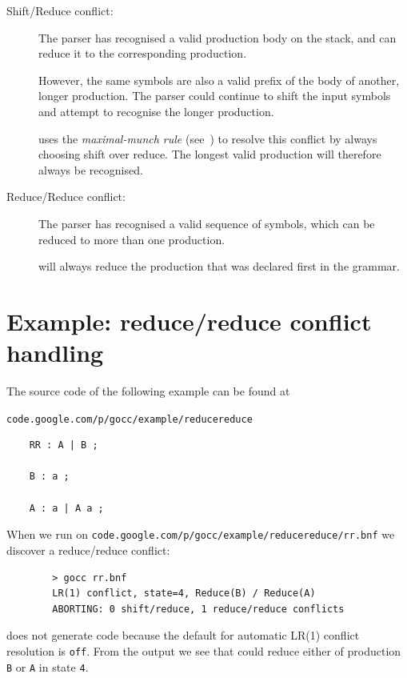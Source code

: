 \documentclass[12pt]{article}
\begin{document}
	\begin{description}
		\item[Shift/Reduce conflict:] The parser has recognised a valid production body on the stack, and can reduce it to the corresponding production. 

		However, the same symbols are also a valid prefix of the body of another, longer production. The parser could continue to shift the input symbols and attempt to recognise the longer production.

		\gocc uses the {\em maximal-munch rule} (see~\cite{Modern Compiler Design}) to resolve this conflict by always choosing shift over reduce. The longest valid production will therefore always be recognised.

		\item[Reduce/Reduce conflict:] The parser has recognised a valid sequence of symbols, which can be reduced to more than one production.

		\gocc will always reduce the production that was declared first in the grammar.
	\end{description}

\section{Example: reduce/reduce conflict handling} \label{sec:example sr}
	The source code of the following example can be found at

	\verb|code.google.com/p/gocc/example/reducereduce|

	\begin{verbatim}
	RR : A | B ;

	B : a ;

	A : a | A a ;

	\end{verbatim}

	When we run \gocc on \verb|code.google.com/p/gocc/example/reducereduce/rr.bnf| we discover a reduce/reduce conflict:

	\begin{verbatim}
		> gocc rr.bnf
		LR(1) conflict, state=4, Reduce(B) / Reduce(A)
		ABORTING: 0 shift/reduce, 1 reduce/reduce conflicts
	\end{verbatim}

	\gocc does not generate code because the default for automatic LR(1) conflict resolution is \verb|off|. From the output we see that \gocc could reduce either of production \verb|B| or \verb|A| in state \verb|4|.
\end{document}

